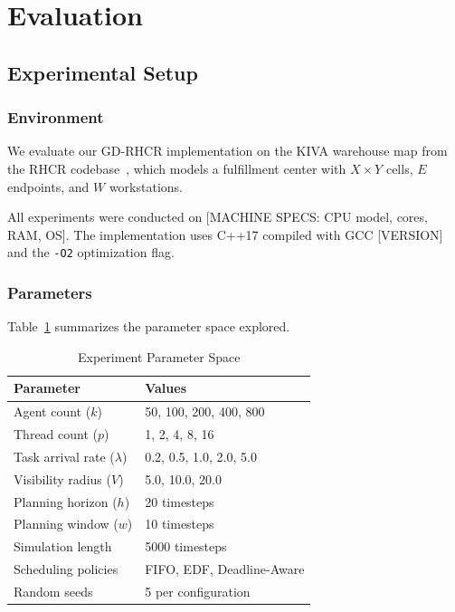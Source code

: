 \section{Evaluation}
\label{sec:evaluation}


\subsection{Experimental Setup}

\subsubsection{Environment}
We evaluate our GD-RHCR implementation on the KIVA warehouse map from the RHCR
codebase~\cite{li2021rhcr}, which models a fulfillment center with $X \times Y$
cells, $E$ endpoints, and $W$ workstations.

All experiments were conducted on [MACHINE SPECS: CPU model, cores, RAM, OS].
The implementation uses C++17 compiled with GCC [VERSION] and the \texttt{-O2}
optimization flag.

\subsubsection{Parameters}
Table~\ref{tab:params} summarizes the parameter space explored.

\begin{table}[h]
\centering
\caption{Experiment Parameter Space}
\label{tab:params}
\begin{tabular}{ll}
\toprule
\textbf{Parameter} & \textbf{Values} \\
\midrule
Agent count ($k$) & 50, 100, 200, 400, 800 \\
Thread count ($p$) & 1, 2, 4, 8, 16 \\
Task arrival rate ($\lambda$) & 0.2, 0.5, 1.0, 2.0, 5.0 \\
Visibility radius ($V$) & 5.0, 10.0, 20.0 \\
Planning horizon ($h$) & 20 timesteps \\
Planning window ($w$) & 10 timesteps \\
Simulation length & 5000 timesteps \\
Scheduling policies & FIFO, EDF, Deadline-Aware \\
Random seeds & 5 per configuration \\
\bottomrule
\end{tabular}
\end{table}

